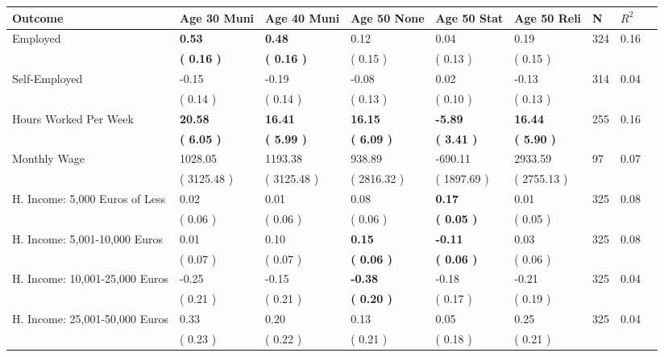 \begin{tabular}{L{6.2cm} C{1.8cm} C{1.8cm} C{1.8cm} C{1.8cm} C{1.8cm} C{1.8cm} C{0.3cm} C{0.3cm}}
\toprule
 \textbf{Outcome} & \textbf{Age 30 Muni} & \textbf{Age 40 Muni} & \textbf{Age 50 None} & \textbf{Age 50 Stat} & \textbf{Age 50 Reli} & \textbf{N} & \textbf{$ R^2$} \\
\midrule
Employed & \textbf{     0.53} & \textbf{     0.48} &      0.12 &      0.04 &      0.19  & 324 &       0.16 \\ 
 & \textbf{(     0.16 )} & \textbf{(     0.16 )} & (     0.15 ) & (     0.13 ) & (     0.15 )  & \\
Self-Employed &     -0.15 &     -0.19 &     -0.08 &      0.02 &     -0.13  & 314 &       0.04 \\ 
 & (     0.14 ) & (     0.14 ) & (     0.13 ) & (     0.10 ) & (     0.13 )  & \\
Hours Worked Per Week & \textbf{    20.58} & \textbf{    16.41} & \textbf{    16.15} & \textbf{    -5.89} & \textbf{    16.44}  & 255 &       0.16 \\ 
 & \textbf{(     6.05 )} & \textbf{(     5.99 )} & \textbf{(     6.09 )} & \textbf{(     3.41 )} & \textbf{(     5.90 )}  & \\
Monthly Wage &   1028.05 &   1193.38 &    938.89 &   -690.11 &   2933.59  & 97 &       0.07 \\ 
 & (  3125.48 ) & (  3125.48 ) & (  2816.32 ) & (  1897.69 ) & (  2755.13 )  & \\
H. Income: 5,000 Euros of Less &      0.02 &      0.01 &      0.08 & \textbf{     0.17} &      0.01  & 325 &       0.08 \\ 
 & (     0.06 ) & (     0.06 ) & (     0.06 ) & \textbf{(     0.05 )} & (     0.05 )  & \\
H. Income: 5,001-10,000 Euros &      0.01 &      0.10 & \textbf{     0.15} & \textbf{    -0.11} &      0.03  & 325 &       0.08 \\ 
 & (     0.07 ) & (     0.07 ) & \textbf{(     0.06 )} & \textbf{(     0.06 )} & (     0.06 )  & \\
H. Income: 10,001-25,000 Euros &     -0.25 &     -0.15 & \textbf{    -0.38} &     -0.18 &     -0.21  & 325 &       0.04 \\ 
 & (     0.21 ) & (     0.21 ) & \textbf{(     0.20 )} & (     0.17 ) & (     0.19 )  & \\
H. Income: 25,001-50,000 Euros &      0.33 &      0.20 &      0.13 &      0.05 &      0.25  & 325 &       0.04 \\ 
 & (     0.23 ) & (     0.22 ) & (     0.21 ) & (     0.18 ) & (     0.21 )  & \\

\end{tabular}
